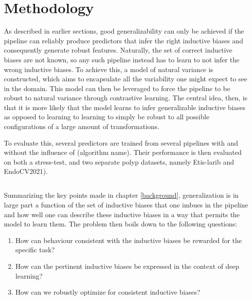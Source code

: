 \chapter{Methodology}
\setcounter{chapter}{3}
    As described in earlier sections, good generalizability can only be achieved if the pipeline can reliably produce predictors that infer the right inductive biases and consequently generate robust features. Naturally, the set of correct inductive biases are not known, so any such pipeline instead has to learn to not infer the wrong inductive biases. To achieve this, a model of natural variance is constructed, which aims to encapsulate all the variability one might expect to see in the domain. This model can then be leveraged to force the pipeline to be robust to natural variance through contrastive learning.  The central idea, then, is that it is more likely that the model learns to infer generalizable inductive biases as opposed to learning to learning to simply be robust to all possible configurations of a large amount of transformations. 
	
	To evaluate this, several predictors are trained from several pipelines with and without the influence of (algorithm name). Their performance is then evaluated on both a stress-test, and two separate polyp datasets, namely Etis-larib and EndoCV2021). 
\section{\alg}
	Summarizing the key points made in chapter \ref{background}, generalization is in large part a function of the set of inductive biases that one imbues in the pipeline and how well one can describe these inductive biases in a way that permits the model to learn them. The problem then boils down to the following questions:
	\begin{enumerate}
		\item How can behaviour consistent with the inductive biases be rewarded for the specific task? \label{loss}
		\item How can the pertinent inductive biases be expressed in the context of deep learning? \label{mnv}
		\item How can we robustly optimize for consistent inductive biases? \label{training}
	\end{enumerate}
	

